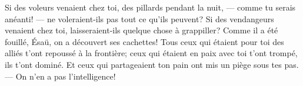 Si des voleurs venaient chez toi, des pillards pendant la nuit,
	--- comme tu serais anéanti! ---
	ne voleraient-ils pas tout ce qu’ils peuvent?
Si des vendangeurs venaient chez toi,
	laisseraient-ils quelque chose à grappiller?
Comme il a été fouillé, Ésaü, on a découvert ses cachettes!
Tous ceux qui étaient pour toi des alliés t’ont repoussé à la frontière;
	ceux qui étaient en paix avec toi t’ont trompé, ils t’ont dominé.
Et ceux qui partageaient ton pain ont mis un piège sous tes pas.
	--- On n’en a pas l’intelligence!
